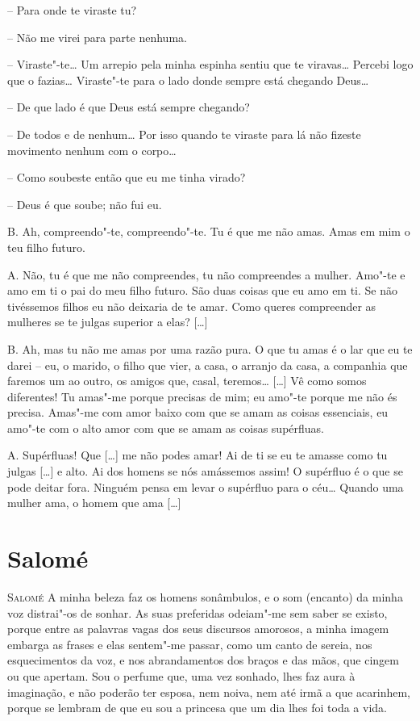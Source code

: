 \asterisc
-- Para onde te viraste tu?

-- Não me virei para parte nenhuma.

-- Viraste"-te\ldots{} Um arrepio pela minha espinha sentiu que te viravas\ldots{}
Percebi logo que o fazias\ldots{} Viraste"-te para o lado donde sempre está
chegando Deus\ldots{}

-- De que lado é que Deus está sempre chegando?

-- De todos e de nenhum\ldots{} Por isso quando te viraste para lá não
fizeste movimento nenhum com o corpo\ldots{}

-- Como soubeste então que eu me tinha virado?

-- Deus é que soube; não fui eu.

\asterisc

\textsc{B.} Ah, compreendo"-te, compreendo"-te. Tu é que me não amas. Amas em mim
o teu filho futuro.

\textsc{A.} Não, tu é que me não compreendes, tu não compreendes a mulher.
Amo"-te e amo em ti o pai do meu filho futuro. São duas coisas que eu
amo em ti. Se não tivéssemos filhos eu não deixaria de te amar. Como
queres compreender as mulheres se te julgas superior a elas? [\ldots{}]

\textsc{B.} Ah, mas tu não me amas por uma razão pura. O que tu amas é o lar
que eu te darei -- eu, o marido, o filho que vier, a casa, o arranjo
da casa, a companhia que faremos um ao outro, os amigos que, casal,
teremos\ldots{} [\ldots{}] Vê como somos diferentes! Tu amas"-me porque precisas
de mim; eu amo"-te porque me não és precisa. Amas"-me com amor baixo
com que se amam as coisas essenciais, eu amo"-te com o alto amor com
que se amam as coisas supérfluas.

\textsc{A.} Supérfluas! Que [\ldots{}] me não podes amar! Ai de ti se eu te amasse
como tu julgas [\ldots{}] e alto. Ai dos homens se nós amássemos assim! O
supérfluo é o que se pode deitar fora. Ninguém pensa em levar o
supérfluo para o céu\ldots{} Quando uma mulher ama, o homem que ama [\ldots{}]


\chapter{Salomé}

\textsc{Salomé} A minha beleza faz os homens sonâmbulos, e o som (encanto)
da minha voz distrai"-os de sonhar. As suas preferidas odeiam"-me sem
saber se existo, porque entre as palavras vagas dos seus discursos
amorosos, a minha imagem embarga as frases e elas sentem"-me passar,
como um canto de sereia, nos esquecimentos da voz, e nos
abrandamentos dos braços e das mãos, que cingem ou que apertam. Sou o
perfume que, uma vez sonhado, lhes faz aura à imaginação, e não
poderão ter esposa, nem noiva, nem até irmã a que acarinhem, porque
se lembram de que eu sou a princesa que um dia lhes foi toda a vida. 

